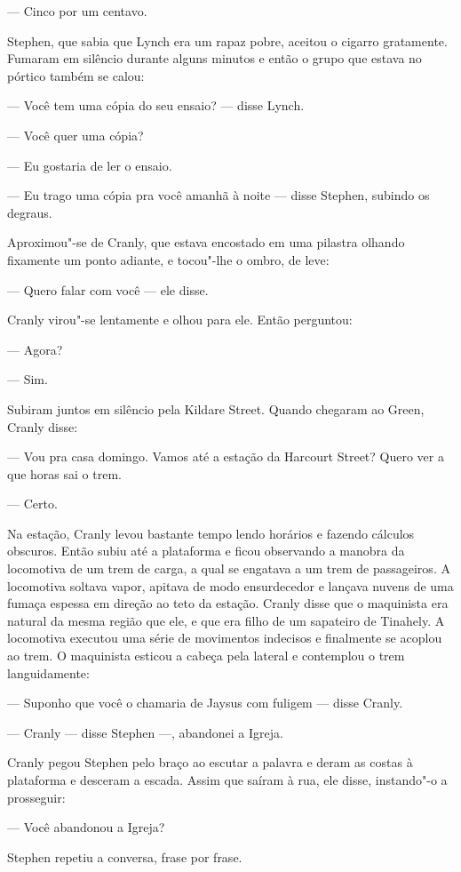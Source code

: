--- Cinco por um centavo.

Stephen, que sabia que Lynch era um rapaz pobre, aceitou o cigarro gratamente.
Fumaram em silêncio durante alguns minutos e então o grupo que estava no
pórtico também se calou:

--- Você tem uma cópia do seu ensaio? --- disse Lynch.

--- Você quer uma cópia?

--- Eu gostaria de ler o ensaio.

--- Eu trago uma cópia pra você amanhã à noite --- disse Stephen, subindo os
degraus.

Aproximou"-se de Cranly, que estava encostado em uma pilastra olhando fixamente
um ponto adiante, e tocou"-lhe o ombro, de leve:

--- Quero falar com você --- ele disse.

Cranly virou"-se lentamente e olhou para ele.  Então perguntou:

--- Agora?

--- Sim.

Subiram juntos em silêncio pela Kildare Street.  Quando chegaram ao Green,
Cranly disse:

--- Vou pra casa domingo.  Vamos até a estação da Harcourt Street?  Quero ver
a que horas sai o trem.

--- Certo.

Na estação, Cranly levou bastante tempo lendo horários e fazendo cálculos
obscuros.  Então subiu até a plataforma e ficou observando a manobra da
locomotiva de um trem de carga, a qual se engatava a um trem de passageiros.  A
locomotiva soltava vapor, apitava de modo ensurdecedor e lançava nuvens de uma
fumaça espessa em direção ao teto da estação.  Cranly disse que o maquinista
era natural da mesma região que ele, e que era filho de um sapateiro de
Tinahely.  A locomotiva executou uma série de movimentos indecisos e finalmente
se acoplou ao trem.  O maquinista esticou a cabeça pela lateral e contemplou o
trem languidamente:

--- Suponho que você o chamaria de Jaysus com fuligem --- disse Cranly.

--- Cranly --- disse Stephen ---, abandonei a Igreja.

Cranly pegou Stephen pelo braço ao escutar a palavra e deram as costas à
plataforma e desceram a escada.  Assim que saíram à rua, ele disse, instando"-o
a prosseguir:

--- Você abandonou a Igreja?

Stephen repetiu a conversa, frase por frase.

